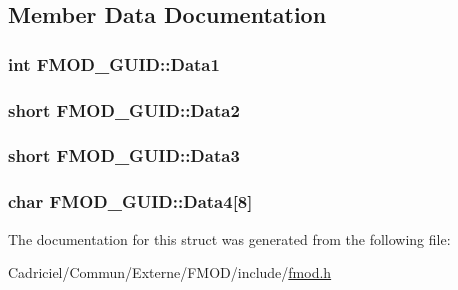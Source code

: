 \subsection{Member Data Documentation}
\hypertarget{struct_f_m_o_d___g_u_i_d_ade5cc5a3c9665147a488c8a9e2ea211c}{
\subsubsection[{Data1}]{ {\bf int} F\-M\-O\-D\-\_\-\-G\-U\-I\-D\-::\-Data1}}\label{struct_f_m_o_d___g_u_i_d_ade5cc5a3c9665147a488c8a9e2ea211c}
\hypertarget{struct_f_m_o_d___g_u_i_d_ac5805cdbaf5cfa2113d637e11f6ad36e}{
\subsubsection[{Data2}]{ short F\-M\-O\-D\-\_\-\-G\-U\-I\-D\-::\-Data2}}\label{struct_f_m_o_d___g_u_i_d_ac5805cdbaf5cfa2113d637e11f6ad36e}
\hypertarget{struct_f_m_o_d___g_u_i_d_a98f6f2f06cad235236cbc86099aa4e96}{
\subsubsection[{Data3}]{ short F\-M\-O\-D\-\_\-\-G\-U\-I\-D\-::\-Data3}}\label{struct_f_m_o_d___g_u_i_d_a98f6f2f06cad235236cbc86099aa4e96}
\hypertarget{struct_f_m_o_d___g_u_i_d_a3a1337ea3f0bec8fbddd197ebdb29cf7}{
\subsubsection[{Data4}]{ char F\-M\-O\-D\-\_\-\-G\-U\-I\-D\-::\-Data4\mbox{[}8\mbox{]}}}\label{struct_f_m_o_d___g_u_i_d_a3a1337ea3f0bec8fbddd197ebdb29cf7}


The documentation for this struct was generated from the following file\-:\begin{DoxyCompactItemize}
\item 
Cadriciel/\-Commun/\-Externe/\-F\-M\-O\-D/include/\hyperlink{fmod_8h}{fmod.\-h}\end{DoxyCompactItemize}
